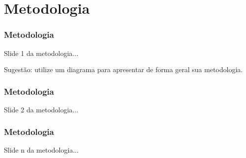 \section{Metodologia}


\begin{frame}

    \frametitle{Metodologia}

    Slide 1 da metodologia...
    
    Sugestão: utilize um diagrama para apresentar de forma geral sua metodologia.

\end{frame}


\begin{frame}

    \frametitle{Metodologia}

    Slide 2 da metodologia...

\end{frame}


\begin{frame}

    \frametitle{Metodologia}

    Slide n da metodologia...

\end{frame}